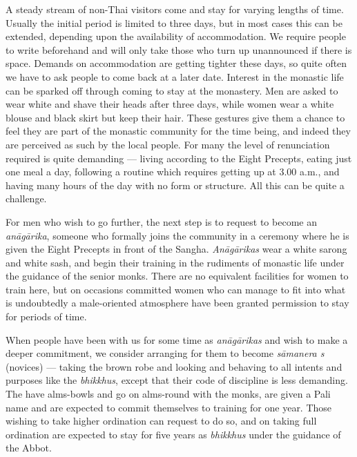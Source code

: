 A steady stream of non-Thai visitors come and stay for varying lengths
of time. Usually the initial period is limited to three days, but in
most cases this can be extended, depending upon the availability of
accommodation. We require people to write beforehand and will only take
those who turn up unannounced if there is space. Demands on
accommodation are getting tighter these days, so quite often we have to
ask people to come back at a later date. Interest in the monastic life
can be sparked off through coming to stay at the monastery. Men are
asked to wear white and shave their heads after three days, while women
wear a white blouse and black skirt but keep their hair. These gestures
give them a chance to feel they are part of the monastic community for
the time being, and indeed they are perceived as such by the local
people. For many the level of renunciation required is quite demanding
--- living according to the Eight Precepts, eating just one meal a day,
following a routine which requires getting up at 3.00 a.m., and having
many hours of the day with no form or structure. All this can be quite a
challenge.

For men who wish to go further, the next step is to request to become an
\emph{anāgārika}, someone who formally joins the community in a ceremony
where he is given the Eight Precepts in front of the Sangha.
\emph{Anāgārikas} wear a white sarong and white sash, and begin their
training in the rudiments of monastic life under the guidance of the
senior monks. There are no equivalent facilities for women to train
here, but on occasions committed women who can manage to fit into what
is undoubtedly a male-oriented atmosphere have been granted permission
to stay for periods of time.

When people have been with us for some time as \emph{anāgārikas} and
wish to make a deeper commitment, we consider arranging for them to
become \emph{sāmanera s} (novices) --- taking the brown robe and looking
and behaving to all intents and purposes like the \emph{bhikkhus},
except that their code of discipline is less demanding. The have
alms-bowls and go on alms-round with the monks, are given a Pali name
and are expected to commit themselves to training for one year. Those
wishing to take higher ordination can request to do so, and on taking
full ordination are expected to stay for five years as \emph{bhikkhus}
under the guidance of the Abbot.

